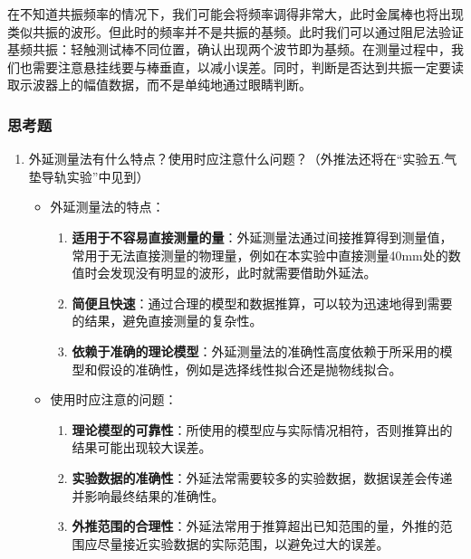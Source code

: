 \documentclass[zihao=5, UTF8]{article}
\theoremstyle{MyLineTheoremStyle} %
\theoremstyle{MyBlockTheoremStyle} %
\theoremstyle{MySubsubsectionStyle} %
\begin{document}
在不知道共振频率的情况下，我们可能会将频率调得非常大，此时金属棒也将出现类似共振的波形。但此时的频率并不是共振的基频。此时我们可以通过阻尼法验证基频共振：轻触测试棒不同位置，确认出现两个波节即为基频。在测量过程中，我们也需要注意悬挂线要与棒垂直，以减小误差。同时，判断是否达到共振一定要读取示波器上的幅值数据，而不是单纯地通过眼睛判断。

\subsubsection{思考题}

\begin{enumerate}
    \item 外延测量法有什么特点？使用时应注意什么问题？（外推法还将在“实验五.气垫导轨实验”中见到）
    \begin{itemize}
        \item 外延测量法的特点：
        \begin{enumerate}
            \item \textbf{适用于不容易直接测量的量}：外延测量法通过间接推算得到测量值，常用于无法直接测量的物理量，例如在本实验中直接测量40mm处的数值时会发现没有明显的波形，此时就需要借助外延法。
            \item \textbf{简便且快速}：通过合理的模型和数据推算，可以较为迅速地得到需要的结果，避免直接测量的复杂性。
            \item \textbf{依赖于准确的理论模型}：外延测量法的准确性高度依赖于所采用的模型和假设的准确性，例如是选择线性拟合还是抛物线拟合。
        \end{enumerate}
        \item 使用时应注意的问题：
        \begin{enumerate}
            \item \textbf{理论模型的可靠性}：所使用的模型应与实际情况相符，否则推算出的结果可能出现较大误差。
            \item \textbf{实验数据的准确性}：外延法常需要较多的实验数据，数据误差会传递并影响最终结果的准确性。
            \item \textbf{外推范围的合理性}：外延法常用于推算超出已知范围的量，外推的范围应尽量接近实验数据的实际范围，以避免过大的误差。
        \end{enumerate}
    \end{itemize}
    

\end{enumerate}
\end{document}
